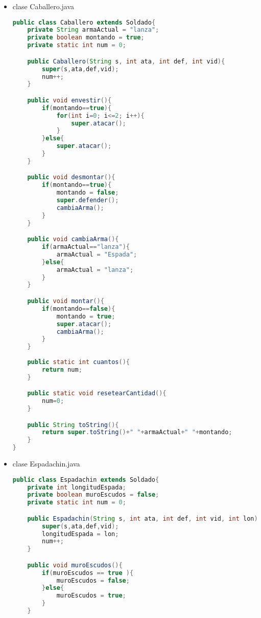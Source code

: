 \documentclass{article}
\begin{document}
\begin{itemize}
\begin{lstlisting}[language=java]
    public String toString(){
        return super.toString()+" "+numeroFlechas;
    }
}
        \end{lstlisting}

        \item clase Caballero.java
        \begin{lstlisting}[language=java]
public class Caballero extends Soldado{
    private String armaActual = "lanza";
    private boolean montando = true;
    private static int num = 0;

    public Caballero(String s, int ata, int def, int vid){
        super(s,ata,def,vid);
        num++;
    }

    public void envestir(){
        if(montando==true){
            for(int i=0; i<=2; i++){
                super.atacar();
            }
        }else{
            super.atacar();
        }
    }

    public void desmontar(){
        if(montando==true){
            montando = false;
            super.defender();
            cambiaArma();
        }
    }

    public void cambiaArma(){
        if(armaActual=="lanza"){
            armaActual = "Espada";
        }else{
            armaActual = "lanza";
        }
    }

    public void montar(){
        if(montando==false){
            montando = true;
            super.atacar();
            cambiaArma();
        }
    }
    
    public static int cuantos(){
        return num;
    }

    public static void resetearCantidad(){
        num=0;
    }

    public String toString(){
        return super.toString()+" "+armaActual+" "+montando;
    }
}

        \end{lstlisting}

        \item clase Espadachin.java
        \begin{lstlisting}[language=java]
public class Espadachin extends Soldado{
    private int longitudEspada;
    private boolean muroEscudos = false;
    private static int num = 0;

    public Espadachin(String s, int ata, int def, int vid, int lon){
        super(s,ata,def,vid);
        longitudEspada = lon;
        num++;
    }

    public void muroEscudos(){
        if(muroEscudos == true ){
            muroEscudos = false;
        }else{
            muroEscudos = true;
        }
    }


\end{lstlisting}
\end{itemize}
\end{document}
